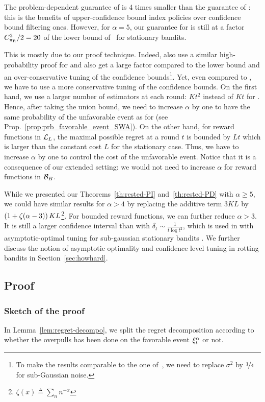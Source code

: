\begin{remark}
The problem-dependent guarantee of \RUCB is 4 times smaller than the guarantee of \FEWA: this is the benefits of upper-confidence bound index policies over confidence bound filtering ones. However, for $\alpha = 5$, our guarantee for \RUCB is still at a factor $C_{\pi_{\rm R}}^2 /2 = 20$ of the lower bound of~\citet{lai1985asymptotically} for stationary bandits.

This is mostly due to our proof technique. Indeed, \citet{auer2002finite} also use a similar high-probability proof for \UCBone and also get a large factor compared to the lower bound and an over-conservative tuning of the confidence bounds\footnote{To make the results comparable to the one of~\citet{auer2002finite}, we need to replace $\sigma^2$ by $\nicefrac{1}{4}$ for sub-Gaussian noise.}. Yet, even compared to \UCBone, we have to use a more conservative tuning of the confidence bounds. On the first hand, we use a larger number of estimators at each round: $Kt^2$ instead of $Kt$ for \UCB. Hence, after taking the union bound, we need to increase $\alpha$ by one to have the same probability of the unfavorable event as for \UCBone (see Prop.~\ref{prop:prb_favorable_event_SWA}). On the other hand, for reward functions in $\mathcal{L}_L$, the maximal possible regret at a round $t$ is bounded by $Lt$ which is larger than the constant cost $L$ for the stationary case. Thus, we have to increase $\alpha$ by one to control the cost of the unfavorable event. Notice that it is a consequence of our extended setting: we would not need to increase $\alpha$ for reward functions in $\mathcal{B}_{B}$.

While we presented our Theorems~\ref{th:rested-PI} and~\ref{th:rested-PD} with $\alpha \geq 5$, we could have similar results for $\alpha > 4$ by replacing the additive term $3KL$ by $\left(1 + \zeta(\alpha-3)\right)KL$\footnote{$\zeta(x) \triangleq \sum_n n^{-x}$}. For bounded reward functions, we can further reduce $\alpha >3$. It is still a larger confidence interval than with $\delta_t \sim \frac{1}{t\log{t}^2}$, which is used in \UCB with asymptotic-optimal tuning for sub-gaussian stationary bandits  \citep{lattimore2020banditbook}.  We further discuss the notion of asymptotic optimality and confidence level tuning in rotting bandits in Section~\ref{sec:howhard}. 
\end{remark}
%
\subsection{Proof}
\subsubsection*{Sketch of the proof}
In Lemma~\ref{lem:regret-decompo}, we split the regret decomposition according to whether the overpulls has been done on the favorable event $\xi^\alpha_t$ or not. 

